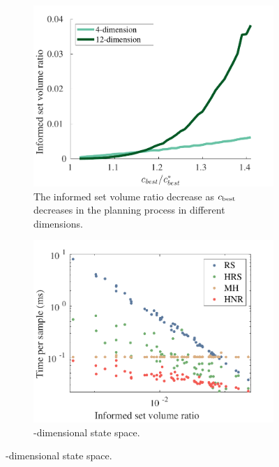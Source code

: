 \documentclass[letterpaper, 10 pt, conference]{ieeeconf}  %
\begin{document}
\begin{figure}[t!]
	\centering
	\begin{subfigure}[t!]{0.325\textwidth}
		\centering
		\includegraphics[width=\textwidth]{fig/sampling_efficiency/levelset}
		\caption{\captionstyle The informed set volume ratio decrease as $ c_{\rm best} $ decreases in the planning process in different dimensions.}
		\label{fig:sampling_efficiency:levelset}
	\end{subfigure}
	\begin{subfigure}[t!]{0.325\textwidth}
		\centering
		\includegraphics[width=\linewidth]{fig/sampling_efficiency/sample_efficiency_2d}
		\caption{-dimensional state space.}
		\label{fig:sampling_efficiency:2d}

\end{subfigure}
\end{figure}
\end{document}
